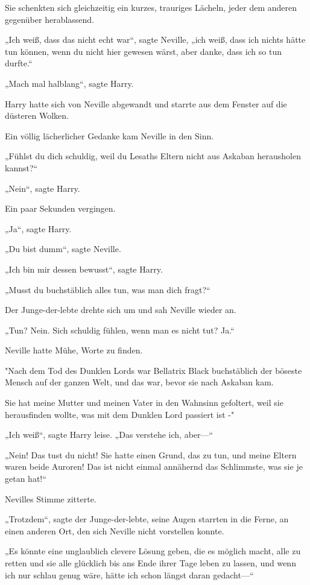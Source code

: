 {Sie schenkten sich gleichzeitig ein kurzes, trauriges Lächeln, jeder dem anderen gegenüber herablassend.

„Ich weiß, dass das nicht echt war“, sagte Neville, „ich weiß, dass ich nichts hätte tun können, wenn du nicht hier gewesen wärst, aber danke, dass ich so tun durfte.“

„Mach mal halblang“, sagte Harry.

Harry hatte sich von Neville abgewandt und starrte aus dem Fenster auf die düsteren Wolken.

Ein völlig lächerlicher Gedanke kam Neville in den Sinn.

„Fühlst du dich schuldig, weil du Lesaths Eltern nicht aus Askaban herausholen kannst?“

„Nein“, sagte Harry.

Ein paar Sekunden vergingen.

„Ja“, sagte Harry.

„Du bist dumm“, sagte Neville.

„Ich bin mir dessen bewusst“, sagte Harry.

„Musst du buchstäblich alles tun, was man dich fragt?“

Der Junge-der-lebte drehte sich um und sah Neville wieder an.

„Tun? Nein. Sich schuldig fühlen, wenn man es nicht tut? Ja.“

Neville hatte Mühe, Worte zu finden.

"Nach dem Tod des Dunklen Lords war Bellatrix Black buchstäblich der böseste Mensch auf der ganzen Welt, und das war, bevor sie nach Askaban kam.

Sie hat meine Mutter und meinen Vater in den Wahnsinn gefoltert, weil sie herausfinden wollte, was mit dem Dunklen Lord passiert ist -"

„Ich weiß“, sagte Harry leise. „Das verstehe ich, aber—“

„Nein! Das tust du nicht! Sie hatte einen Grund, das zu tun, und meine Eltern waren beide Auroren! Das ist nicht einmal annähernd das Schlimmste, was sie je getan hat!“

Nevilles Stimme zitterte.

„Trotzdem“, sagte der Junge-der-lebte, seine Augen starrten in die Ferne, an einen anderen Ort, den sich Neville nicht vorstellen konnte.

„Es könnte eine unglaublich clevere Lösung geben, die es möglich macht, alle zu retten und sie alle glücklich bis ans Ende ihrer Tage leben zu lassen, und wenn ich nur schlau genug wäre, hätte ich schon längst daran gedacht—“

}
